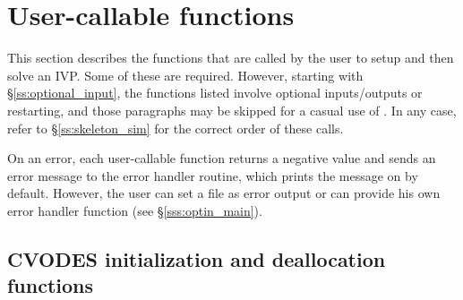 


\section{User-callable functions}\label{ss:callable_fct_sim}

This section describes the {\cvodes} functions that are called by the
user to setup and then solve an IVP. Some of these are required. However,
starting with \S\ref{ss:optional_input}, the functions listed involve
optional inputs/outputs or restarting, and those paragraphs may be
skipped for a casual use of {\cvodes}. In any case, refer to
\S\ref{ss:skeleton_sim} for the correct order of these calls.

On an error, each user-callable function returns a negative value and
sends an error message to the error handler routine, which prints the
message on  by default. However, the user can set a file
as error output or can provide his own error handler function (see
\S\ref{sss:optin_main}).

\subsection{CVODES initialization and deallocation functions}
\label{sss:cvodemalloc}

